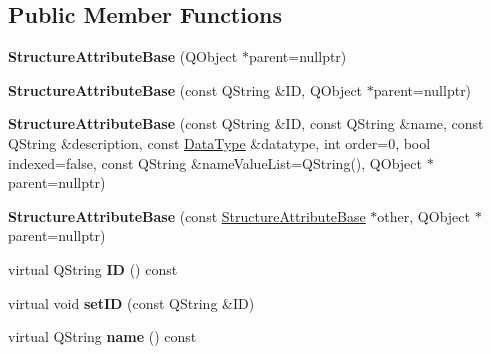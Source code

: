 \subsection*{Public Member Functions}
\begin{DoxyCompactItemize}
\item 
\mbox{\label{class_structure_attribute_base_a67d1218bd56aba2d0f269ada5b7cb2a4}} 
{\bfseries Structure\+Attribute\+Base} (Q\+Object $\ast$parent=nullptr)
\item 
\mbox{\label{class_structure_attribute_base_aff828fd00b19bfa14b09d411f147051b}} 
{\bfseries Structure\+Attribute\+Base} (const Q\+String \&ID, Q\+Object $\ast$parent=nullptr)
\item 
\mbox{\label{class_structure_attribute_base_ad927b4a69bfb8b4d1f2e79986cb5c6b3}} 
{\bfseries Structure\+Attribute\+Base} (const Q\+String \&ID, const Q\+String \&name, const Q\+String \&description, const \hyperlink{class_data_type}{Data\+Type} \&datatype, int order=0, bool indexed=false, const Q\+String \&name\+Value\+List=Q\+String(), Q\+Object $\ast$parent=nullptr)
\item 
\mbox{\label{class_structure_attribute_base_a54677a82c9acb9495fdf43cc87344ee8}} 
{\bfseries Structure\+Attribute\+Base} (const \hyperlink{class_structure_attribute_base}{Structure\+Attribute\+Base} $\ast$other, Q\+Object $\ast$parent=nullptr)
\item 
\mbox{\label{class_structure_attribute_base_a52182636a19ca9173cd4527c1e2e4bdc}} 
virtual Q\+String {\bfseries ID} () const
\item 
\mbox{\label{class_structure_attribute_base_acf1a3fb07e7680b6c386cfbd12ab74a7}} 
virtual void {\bfseries set\+ID} (const Q\+String \&ID)
\item 
\mbox{\label{class_structure_attribute_base_a9c48f431e87f3a44517f23b73a1d6069}} 
virtual Q\+String {\bfseries name} () const
\item 
\mbox{\label{class_structure_attribute_base_ad8b89f945ce3093a9ccf09a590e7ca98}} 

\end{DoxyCompactItemize}
